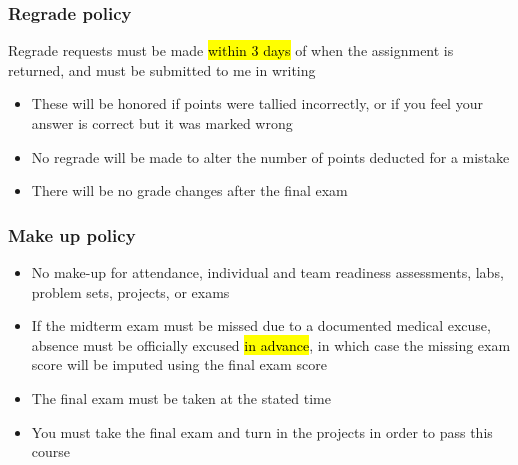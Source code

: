\documentclass[slidestop,compress,mathserif,12pt,t,professionalfonts,xcolor=table]{beamer}
\begin{document}
\begin{frame}
\frametitle{Regrade policy}

Regrade requests must be made \hl{within 3 days} of when the assignment is returned, and must be submitted to me in writing 

\begin{itemize}

\item These will be honored if points were tallied incorrectly, or if you feel your answer is correct but it was marked wrong

\item No regrade will be made to alter the number of points deducted for a mistake

\item There will be no grade changes after the final exam

\end{itemize}

\end{frame}


\begin{frame}
\frametitle{Make up policy}

\begin{itemize}

\item No make-up for attendance, individual and team readiness assessments, labs, problem sets, projects, or exams

\item If the midterm exam must be missed due to a documented medical excuse, absence must be officially excused \hl{in advance}, in which case the missing exam score will be imputed using the final exam score

\item The final exam must be taken at the stated time

\item You must take the final exam and turn in the projects in order to pass this course

\end{itemize}


\end{frame}

\end{document}
